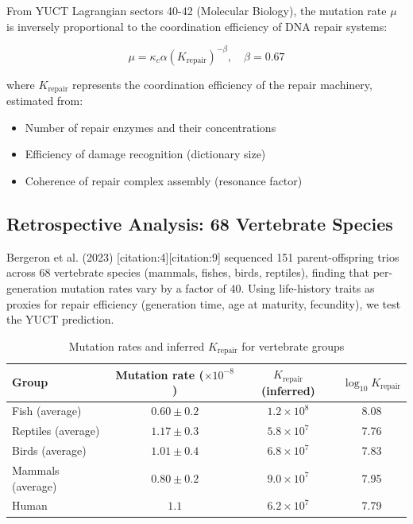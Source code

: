 \documentclass[11pt]{article}
\begin{document}
	From YUCT Lagrangian sectors 40-42 (Molecular Biology), the mutation rate \(\mu\) is inversely proportional to the coordination efficiency of DNA repair systems:
	
	\begin{equation}
		\mu = \kappa_c \alpha \left(K_{\text{repair}}\right)^{-\beta}, \quad \beta = 0.67
		\label{eq:mutation-rate}
	\end{equation}
	
	where \(K_{\text{repair}}\) represents the coordination efficiency of the repair machinery, estimated from:
	\begin{itemize}
		\item Number of repair enzymes and their concentrations
		\item Efficiency of damage recognition (dictionary size)
		\item Coherence of repair complex assembly (resonance factor)
	\end{itemize}
	
	\subsection{Retrospective Analysis: 68 Vertebrate Species}
	
	Bergeron et al. (2023) [citation:4][citation:9] sequenced 151 parent-offspring trios across 68 vertebrate species (mammals, fishes, birds, reptiles), finding that per-generation mutation rates vary by a factor of 40. Using life-history traits as proxies for repair efficiency (generation time, age at maturity, fecundity), we test the YUCT prediction.
	
	\begin{table}[h]
		\centering
		\caption{Mutation rates and inferred \(K_{\text{repair}}\) for vertebrate groups}
		\label{tab:vertebrate-mutations}
		\begin{tabular}{lccc}
			\toprule
			\textbf{Group} & \textbf{Mutation rate (\(\times 10^{-8}\))} & \textbf{\(K_{\text{repair}}\) (inferred)} & \(\log_{10} K_{\text{repair}}\) \\
			\midrule
			Fish (average) & \(0.60 \pm 0.2\) & \(1.2 \times 10^8\) & 8.08 \\
			Reptiles (average) & \(1.17 \pm 0.3\) & \(5.8 \times 10^7\) & 7.76 \\
			Birds (average) & \(1.01 \pm 0.4\) & \(6.8 \times 10^7\) & 7.83 \\
			Mammals (average) & \(0.80 \pm 0.2\) & \(9.0 \times 10^7\) & 7.95 \\
			Human & \(1.1\) & \(6.2 \times 10^7\) & 7.79 \\
			\bottomrule
		\end{tabular}
	\end{table}
	
\end{document}
